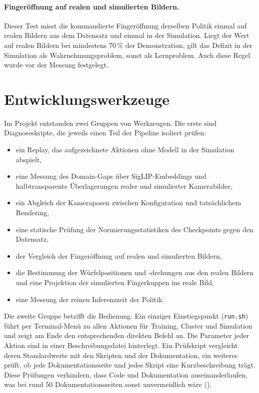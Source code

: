 \paragraph{Fingeröffnung auf realen und simulierten Bildern.}
Dieser Test misst die kommandierte Fingeröffnung derselben Politik einmal auf
realen Bildern aus dem Datensatz und einmal in der Simulation. Liegt der Wert
auf realen Bildern bei mindestens 70\,\% der Demonstration, gilt das Defizit
in der Simulation als Wahrnehmungsproblem, sonst als Lernproblem. Auch diese
Regel wurde vor der Messung festgelegt.

\section{Entwicklungswerkzeuge}
\label{sec:werkzeuge}

Im Projekt entstanden zwei Gruppen von Werkzeugen. Die erste sind
Diagnoseskripte, die jeweils einen Teil der Pipeline isoliert prüfen:

\begin{itemize}
  \item ein Replay, das aufgezeichnete Aktionen ohne Modell in der Simulation
    abspielt,
  \item eine Messung des Domain-Gaps über SigLIP-Embeddings und halbtransparente
    Überlagerungen realer und simulierter Kamerabilder,
  \item ein Abgleich der Kameraposen zwischen Konfiguration und tatsächlichem
    Rendering,
  \item eine statische Prüfung der Normierungsstatistiken des Checkpoints
    gegen den Datensatz,
  \item der Vergleich der Fingeröffnung auf realen und simulierten Bildern,
  \item die Bestimmung der Würfelpositionen und -drehungen aus den realen
    Bildern und eine Projektion der simulierten Fingerkuppen ins reale Bild,
  \item eine Messung der reinen Inferenzzeit der Politik.
\end{itemize}

Die zweite Gruppe betrifft die Bedienung. Ein einziger Einstiegspunkt
(\texttt{run.sh}) führt per Terminal-Menü zu allen Aktionen für Training,
Cluster und Simulation und zeigt am Ende den entsprechenden direkten Befehl
an. Die Parameter jeder Aktion sind in einer Beschreibungsdatei hinterlegt.
Ein Prüfskript vergleicht deren Standardwerte mit den Skripten und der
Dokumentation, ein weiteres prüft, ob jede Dokumentationsseite und jedes
Skript eine Kurzbeschreibung trägt. Diese Prüfungen verhindern, dass Code
und Dokumentation auseinanderlaufen, was bei rund 50 Dokumentationsseiten
sonst unvermeidlich wäre ().
